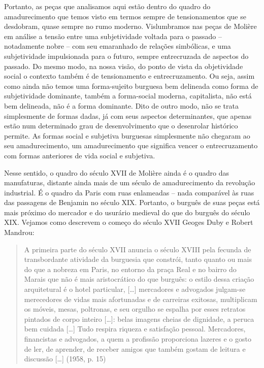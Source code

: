 Portanto, as peças que analisamos aqui estão dentro do quadro do
amadurecimento que temos visto em termos sempre de tensionamentos que se
desdobram, quase sempre no rumo moderno. Vislumbramos nas peças de
Molière em análise a tensão entre uma subjetividade voltada para o
passado -- notadamente nobre -- com seu emaranhado de relações
simbólicas, e uma subjetividade impulsionada para o futuro, sempre
entrecruzada de aspectos do passado. Do mesmo modo, na nossa visão, do
ponto de vista da objetividade social o contexto também é de
tensionamento e entrecruzamento. Ou seja, assim como ainda não temos uma
forma-sujeito burguesa bem delineada como forma de subjetividade
dominante, também a forma-social moderna, capitalista, não está bem
delineada, não é a forma dominante. Dito de outro modo, não se trata
simplesmente de formas dadas, já com seus aspectos determinantes, que
apenas estão num determinado grau de desenvolvimento que o desenrolar
histórico permite. As formas social e subjetiva burguesas simplesmente
não chegaram ao seu amadurecimento, um amadurecimento que significa
vencer o entrecruzamento com formas anteriores de vida social e
subjetiva.

Nesse sentido, o quadro do século XVII de Molière ainda é o quadro das
manufaturas, distante ainda mais de um século de amadurecimento da
revolução industrial. É o quadro da Paris com ruas enlameadas -- nada
comparável às ruas das passagens de Benjamin no século XIX. Portanto, o
burguês de suas peças está mais próximo do mercador e do usurário
medieval do que do burguês do século XIX. Vejamos como descrevem o
começo do século XVII Geoges Duby e Robert Mandrou:

\begin{quote}
A primeira parte do século XVII anuncia o século XVIII pela fecunda de
transbordante atividade da burguesia que constrói, tanto quanto ou mais
do que a nobreza em Paris, no entorno da praça Real e no bairro do
Marais que não é mais aristocrático do que burguês: o estilo dessa
criação arquitetural é o hotel particular, {[}\ldots{}{]} mercadores e
advogados julgam-se merecedores de vidas mais afortunadas e de carreiras
exitosas, multiplicam os móveis, mesas, poltronas, e seu orgulho se
espalha por esses retratos pintados de corpo inteiro {[}\ldots{}{]}:
belas imagens cheias de dignidade, a peruca bem cuidada {[}\ldots{}{]}
Tudo respira riqueza e satisfação pessoal. Mercadores, financistas e
advogados, a quem a profissão proporciona lazeres e o gosto de ler, de
aprender, de receber amigos que também gostam de leitura e discussão
{[}\ldots{}{]} (1958, p. 15)
\end{quote}

